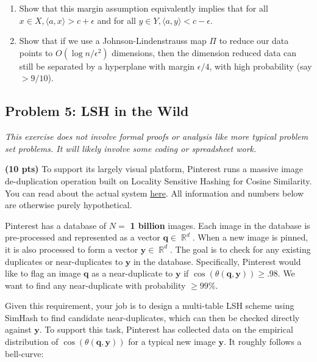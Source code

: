 \documentclass[10pt]{article}
\DeclareMathOperator{\R}{\mathbb{R}}
\newcommand{\bv}[1]{\mathbf{#1}}
\begin{document}
\begin{enumerate}
	\item Show that this margin assumption equivalently implies that for all $x\in X, \langle a, x\rangle > c + \epsilon$ and for all $y\in Y, \langle a, y\rangle < c - \epsilon$.
	
	\item Show that if we use a Johnson-Lindenstrauss map $\Pi$ to reduce our data points to $O(\log n/\epsilon^2)$ dimensions, then the dimension reduced data can still be separated by a hyperplane with margin $\epsilon/4$, with high probability (say $> 9/10$).
\end{enumerate}

\subsection{Problem 5: LSH in the Wild} 
\textit{This exercise does not involve formal proofs or analysis like more typical problem set problems. It will likely involve some coding or spreadsheet work.}
\vspace{.25em}

\noindent\textbf{(10 pts)}
To support its largely visual platform, Pinterest runs a massive image de-duplication operation built on Locality Sensitive Hashing for Cosine Similarity. You can read about the actual system \href{https://medium.com/pinterest-engineering/detecting-image-similarity-using-spark-lsh-and-tensorflow-618636afc939}{here}. All information and numbers below are otherwise purely hypothetical.

Pinterest has a database of $N = $ \textbf{1 billion} images. Each image in the database is pre-processed and represented as a vector $\bv{q}\in \R^d$. When a new image is pinned, it is also processed to form a vector $\bv{y} \in \R^d$. The goal is to check for any existing duplicates or near-duplicates to $\bv{y}$ in the database.  
Specifically, Pinterest would like to flag an image $\bv{q}$ as a near-duplicate to $\bv{y}$ if $\cos(\theta(\bv{q},\bv{y})) \geq .98$. We want to find any near-duplicate with probability $\geq 99\%$. 

Given this requirement, your job is to design a multi-table LSH scheme using SimHash to find candidate near-duplicates, which can then be checked directly against $\bv{y}$. To support this task, Pinterest has collected data on the empirical distribution of $\cos(\theta(\bv{q},\bv{y}))$ for a typical new image $\bv{y}$. It roughly follows a bell-curve:
\end{document}
